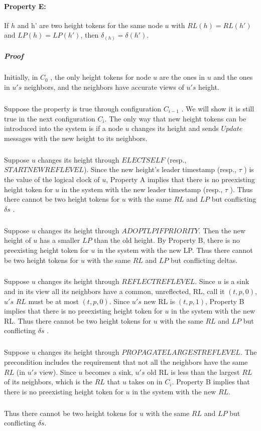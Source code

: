 \paragraph{Property E:}If $h$ and h' are two height tokens for the same node $u$ with $RL(h) = RL(h')$ and $LP(h) = LP(h')$, then $\delta _(h) = \delta (h' )$.
\subparagraph{Proof}Initially, in $C_0$ , the only height tokens for node $u$ are the ones in $u$ and the ones in $u's$ neighbors, and the neighbors have accurate views of $u's$ height.
\subparagraph{}Suppose the property is true through configuration $C_{i-1}$ . We will show it is still true in the next configuration $C_i$. The only way that new height tokens can be introduced into the system is if a node $u$ changes its height and sends $Update$ messages with the new height to its neighbors.
\subparagraph{}Suppose $u$ changes its height through $ELECTSELF$ (resp., $STARTNEWREFLEVEL$). Since the new height's leader timestamp (resp., $\tau$ ) is the value of the logical clock of $u$, Property A implies that there is no preexisting height token for $u$ in the system with the new leader timestamp (resp., $\tau$ ). Thus there cannot be two height tokens for $u$ with the same $RL$ and $LP$ but conflicting $\delta s$ .
\subparagraph{}Suppose $u$ changes its height through $ADOPTLPIFPRIORITY$. Then the new height of $u$ has a smaller $LP$ than the old height. By Property B, there is no preexisting height token for $u$ in the system with the new LP. Thus there cannot be two height tokens for $u$ with the same $RL$ and $LP$ but conflicting deltas.
\subparagraph{}Suppose $u$ changes its height through $REFLECTREFLEVEL$. Since $u$ is a sink and in its view all its neighbors have a common, unreflected, RL, call it $(t, p, 0)$, $u's$ $RL$ must be at most $(t, p, 0)$. Since $u's$ new RL is $(t, p, 1)$, Property B implies that there is no preexisting height token for $u$ in the system with the new RL. Thus there cannot be two height tokens for $u$ with the same $RL$ and $LP$ but conflicting $\delta s$ . 
\subparagraph{}Suppose $u$ changes its height through $PROPAGATELARGESTREFLEVEL$. The precondition includes the requirement that not all the neighbors have the same $RL$ (in $u's$ view). Since $u$ becomes a sink, $u's$ old RL is less than the largest $RL$ of its neighbors, which is the $RL$ that $u$ takes on in $C_i$. Property B implies that there is no preexisting height token for $u$ in the system with the new $RL$. 
\subparagraph{}Thus there cannot be two height tokens for $u$ with the same $RL$ and $LP$ but conflicting $\delta s$.


